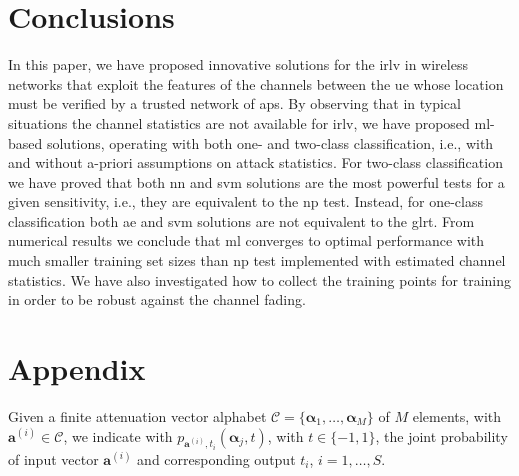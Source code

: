\documentclass[draftcls,onecolumn,12pt]{IEEEtran}
\begin{document}
\section{Conclusions}

In this paper, we have proposed innovative solutions for the \ac{irlv} in wireless networks that exploit the features of the channels between the \ac{ue} whose location must be verified by a trusted network of \acp{ap}. By observing that in typical situations the channel statistics are not available for \ac{irlv}, we have proposed \ac{ml}-based solutions, operating with both one- and two-class classification, i.e., with and without a-priori assumptions on attack statistics. For two-class classification we have proved that  both \ac{nn} and \ac{svm} solutions  are the most powerful tests for a given sensitivity, i.e., they are equivalent to the \ac{np} test. Instead, for one-class classification both \ac{ae} and \ac{svm} solutions are not equivalent to the \ac{glrt}. From numerical results we conclude that \ac{ml} converges to optimal performance with much smaller training set sizes than \ac{np} test implemented with estimated channel statistics. We have also investigated how to collect the training points for training in order to be robust against the channel fading.

\section*{Appendix}

	Given a finite  attenuation vector alphabet $\mathcal C = \{\bm{\alpha}_1, \ldots, \bm{\alpha}_M\}$ of $M$ elements, with $\bm{a}^{(i)} \in \mathcal C$, we indicate with $p_{\bm{a}^{(i)},t_i}(\bm{\alpha}_j, t)$, with $t \in \{-1,1\}$, the joint probability of input vector $\bm{a}^{(i)}$ and corresponding output $t_i$, $i=1, \ldots, S$.
	
\end{document}
